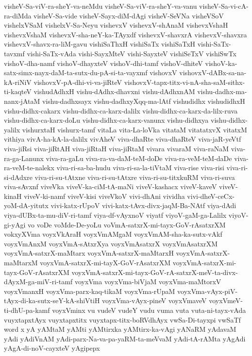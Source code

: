 {visheV-Sa-viV-ra-sheY-va-neMdu
visheV-Sa-viV-ra-sheY-va-vanu
visheV-Sa-vi-cA-ra-diMda
visheV-Sa-vide
visheV-Sayx-diM-dAgi
visheV-SeVNa
visheVSoV
vishelxVSaM
vishelxV-Sa-Neyu
vishevxV
vishevxV-shAnaM
vishevxVshaH
vishevxVshaM
vishevxV-sha-neY-ka-TAyxdf
vishevxV-shavxrA
vishevxV-shavxra
vishevxV-shavx-ra-liM-gavu
vishiSaThxH
vishiSaTx
vishiSaTxH
vishi-SaTx-tavxmf
vishi-SaTx-vAda
vishi-SayxMteV
vishi-SayxteV
vishiSeTxV
vishiSwTx
vishoV-dha-namf
vishoV-dhayxteV
vishoV-dhi-tamf
vishoV-dhiteV
vishoV-ka-satx-simx-nayx-daM-ta-sutx-du-pA-si-ta-vayxmf
vishovxV
vishovxV-dABx-sa-na-kA-riNiV
vishovxV-pA-dhi-vi-va-jiRteV
vishovxV-tapx-titx-vi-nA-sha-saM-sithx-ti-kaqteV
vishudAdhxH
vishu-dAdhx-dhavxni
vishu-dAdhxnAM
vishu-dadhx-ma-nanx-jAtaM
vishu-dadhxsayx
vishu-dadhxyXqq-ma-lAtf
vishudidhx
vishudidhxH
vishu-didhx-cakarx
vishu-didhx-ca-karx-dalilx
vishu-didhx-ca-karx-da-lilx-ruva
vishu-didhx-ca-karx-doLu
vishu-didhx-ca-karx-vanunx
vishu-didhxya
vishu-didhx-yalilx
vishurxtaH
vishurx-tamf
vitaLa
vita-La-loVka
vitataM
vitatatxvX
vitatxM
vithiya
vivA-ha-kA-la-dalilx
vivAheV
viva-dhaRte
viva-dhaRteV
viva-jaR-yeVtf
viva-jiRsi
viva-jiRtAH
viva-jiRtaH
viva-jiRtaM
vivara
vivaraM
viva-raNaM
viva-ra-ga-Lanunx
viva-ra-gaLu
viva-ra-va-daM-teM-doDe
viva-ra-veM-teM-daDe
viva-ra-veM-te-nalekx
viva-ri-sa-ba-hudu
viva-ri-sa-la-tiVtaM
viva-rise
viva-risi
viva-ri-si-dAdxre
viva-ri-su-tAtxne
viva-ri-su-tAtxre
viva-ri-su-titxkuRM
viva-ri-suva
viva-sAvxnf
viveVka
viveV-ka-ciM-tA-maNi
viveV-kashacx
viveV-kaveV
viveV-kinaH
viveV-ki-namf
viveV-kisi
viveVkoV
vivi-dhAni
vividha
vivi-dheV-ceCx-yoM-dA-yitutx
vivi-katx-rUpoV
vivi-katx-tAvx-divx-jaqM-Ba-NAtf
viya-dAdi
viya-dUBx-ta-mu-diV-ri-tamf
viya-df-vAyxnoV
viyatf
viyoV-gaM-ga-Lalilx
viyoV-gi-yAgi
vo
voDe
voMde-De-yoLu
voVmA-satxrX-mi-tayx-GoV-rAsatxrXM
vokxyXVma
voyxVkAraH
voyxVmAMgaM
voyxVmAM-sha-ka-sutx-vAkf
voyxVmAnxM
voyxVmA-sAtxrXya
voyxVmAsatxrX
voyxVmAsatxrXM
voyxVmA-satxrX-maMtarx
voyxVmA-satxrX-maMtarxH
voyxVmA-satxrX-maMtarxM
voyxVmA-satxrX-mi-tayX-GoV-rAsatxrXM
voyxVmA-satxrX-mi-tayx-GoV-rAsatxrXM
voyxVmA-satxrX-mi-tayx-GoV-rA-satxrX-meV-ta-divx-dAyxM-ga-miV-ri-tamf
voyxVma
voyxVma-biVjaM
voyxVma-maMtorxV
voyxVmanxH
voyxVma-parx-kaq-tikaM
voyxVma-rUpaM
voyxVma-vAyx-piV-tAyx-di-ka-sutx-seY-kA-shiVtiH
voyxVma-vAyx-pineV
voyxVmaveV
voyxVmeV-ti-dhU-pa-kamf
voyxVminx
vu
vudeV
vudeY
vudu
vuma
vuta
vuta-ni-tayx-vAda
vuyxtapxtAyx
vuyxtapxtitx
vuyxtapx-titx-boRVdhAyx
vwSa-Di-tayxpi
vwSaTf
word
x
yA
yAMtaM
yAMti
yAMtirxka
yAMtirx-ka-vAgi
yANaRM
yAdavaM
yAdi
yAdiVnAM
yAdi-parx-Na-va-pa-yaRM-ta-meVvaM
yAdi-tA-rAMta
yAgAdi
yAgA-di-noV-cayxteV
yAgipepx
}
